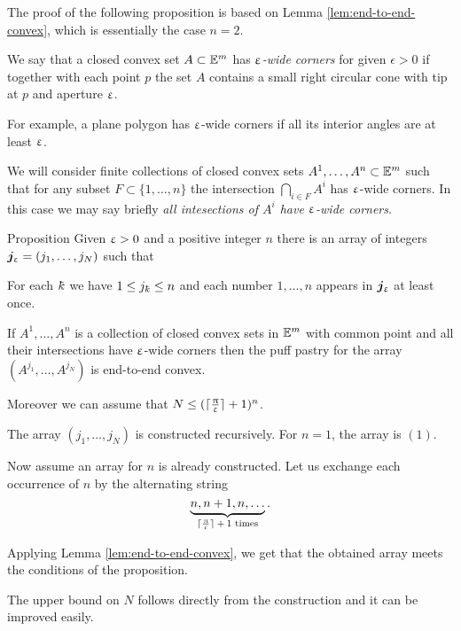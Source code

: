 The proof of the following proposition is based on Lemma \ref{lem:end-to-end-convex},
which is essentially the case $n=2$.

We say that a closed convex set $A\subset \EE^m$ has  \emph{$\upvarepsilon$-wide corners} for given $\epsilon >0$ 
if together with each point $p$
the set $A$ contains a small right circular cone
with tip at $p$ and aperture $\upvarepsilon$.

For example, 
a plane polygon 
has $\upvarepsilon$-wide corners
if all its interior angles are at least $\upvarepsilon$.

We will consider finite collections of closed convex sets 
$A^1,\dots,A^n\subset\EE^m$ 
such that for any subset $F\subset\{1,\dots,n\}$
the intersection
$\bigcap_{i\in F}A^i$ 
has $\upvarepsilon$-wide corners.
In this case we may say briefly \emph{all intesections of $A^i$ have $\upvarepsilon$-wide corners}.

\begin{thm}{Proposition}\label{prop:end-to-end-convex}
Given $\upvarepsilon>0$ and a positive integer $n$
there is an array of integers $\bm{j}_\eps=(j_1,\dots,j_N)$ 
such that 

\begin{subthm}{} For each $\kay$ we have $1\le j_\kay\le n$
and each number $1,\dots,n$ appears in $\bm{j}_\upvarepsilon$ at least once.
\end{subthm}

\begin{subthm}{}
If $A^1,\dots,A^n$ is a collection of closed convex sets in $\mathbb{E}^m$ with common point 
and all their intersections have $\upvarepsilon$-wide corners 
then the puff pastry for the array
$(A^{j_1},\dots,A^{j_N})$ is end-to-end convex.
\end{subthm}

Moreover we can assume that $N\le (\lceil\tfrac\pi\eps\rceil+1)^n$.
\end{thm}

The array $(j_1,\dots,j_N)$ is constructed recursively.
For $n=1$, the array  is $(1)$.

Now assume an array for $n$ is already constructed.
Let us exchange each occurrence of $n$ by the alternating string 
\[\underbrace{n,n+1,n,\dots}_{\text{$\lceil\tfrac\pi\eps\rceil+1$ times}}.\]

Applying Lemma \ref{lem:end-to-end-convex}, 
we get that the obtained array meets the conditions of the proposition.

The upper bound on $N$ follows directly from the construction
and it can be improved easily.
\qeds



